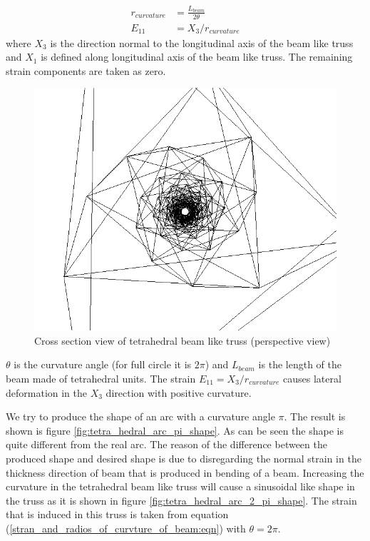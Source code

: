 \begin{equation}
\begin{aligned}
r_{curvature}&=\frac{ L_{beam} }{2 \theta}\\
E_{11}&=X_3/r_{curvature}
\end{aligned}
\label{stran_and_radios_of_curvture_of_beam:eqn}
\end{equation}
where $X_3$ is the direction normal to the longitudinal axis of the beam like truss and $X_1$ is defined along longitudinal axis of the beam like truss. The remaining strain components are taken as zero.
\begin{figure} 
\centering
\includegraphics[width=6.0in]{./chap_5_active_trusses/images_linear_tetrahedral/refrence_shap_100_tetra_unit_tetrahedral_unit_cross_section_view.png}
\caption{Cross section view of tetrahedral beam like truss (perspective view)}
\label{fig:refrence_shap_100_tetra_unit_tetrahedral_unit_cross_section_view}
\end{figure}
$\theta$ is the curvature angle (for full circle it is $2\pi$) and
$ L_{beam}$ is the length of the beam made of tetrahedral units.
The strain $E_{11}=X_3/r_{curvature}$ causes lateral deformation in the $X_3$ direction with positive curvature.

We try to produce the shape of an arc with a curvature angle $\pi$. The result is shown is figure \ref{fig:tetra_hedral_arc_pi_shape}. As can be seen the shape is quite different from the real arc. The reason of the difference between the produced shape and desired shape is due to disregarding the normal strain in the thickness direction of beam that is produced in bending of a beam. Increasing the curvature in the tetrahedral beam like truss will cause a sinusoidal like shape in the truss as it is shown in figure \ref{fig:tetra_hedral_arc_2_pi_shape}. The strain that is induced in this truss is taken from equation (\ref{stran_and_radios_of_curvture_of_beam:eqn}) with $\theta=2 \pi$.

